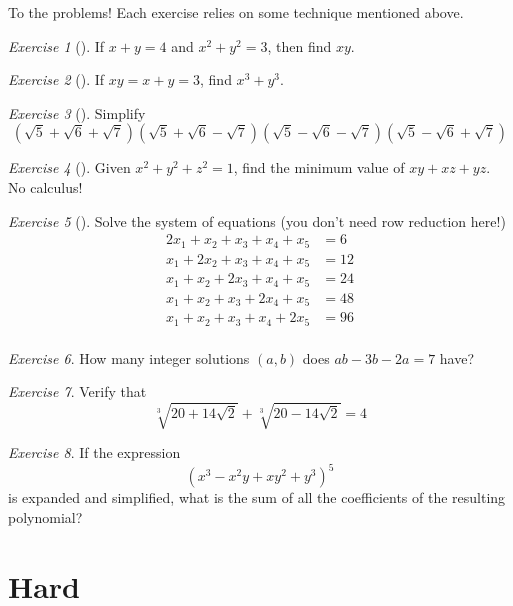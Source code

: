 \documentclass{article}
\theoremstyle{definition}
\theoremstyle{remark}
\newtheorem{exercise}{Exercise}
\begin{document}
To the problems! Each exercise relies on some technique mentioned above.

\begin{exercise}[]
If $x+y = 4$ and $x^2 + y^2 = 3$, then find $xy$.
\end{exercise}

\begin{exercise}[]
If $xy=x+y = 3$, find $x^3+y^3$.
\end{exercise}

\begin{exercise}[]
Simplify
\[\left(\sqrt{5}+\sqrt{6}+\sqrt{7}\right)\left(\sqrt{5}+\sqrt{6}-\sqrt{7}\right)\left(\sqrt{5}-\sqrt{6}-\sqrt{7}\right)\left(\sqrt{5}-\sqrt{6}+\sqrt{7}\right)\]
\end{exercise}

\begin{exercise}[]
Given $x^2 + y^2 + z^2 = 1$, find the minimum value of $xy+xz+yz$. No calculus!
\end{exercise}

\begin{exercise}[]
Solve the system of equations (you don't need row reduction here!)
\begin{align*}
    2x_1+x_2+x_3+x_4+x_5&=6 \\
    x_1+2x_2+x_3+x_4+x_5&=12 \\
    x_1+x_2+2x_3+x_4+x_5&=24 \\
    x_1+x_2+x_3+2x_4+x_5&=48 \\
    x_1+x_2+x_3+x_4+2x_5&=96 \\
\end{align*}
\end{exercise}

\begin{exercise}
How many integer solutions \((a,b)\) does \(ab-3b-2a=7\) have?
\end{exercise}

\begin{exercise}
Verify that
\[\sqrt[3]{20+14\sqrt{2}}+\sqrt[3]{20-14\sqrt{2}}=4\]
\end{exercise}

\begin{exercise}
If the expression 
\[(x^3-x^2y+xy^2+y^3)^5\] 
is expanded and simplified, what is the sum of all the coefficients of the resulting polynomial?
\end{exercise}

\section{Hard}
\end{document}
